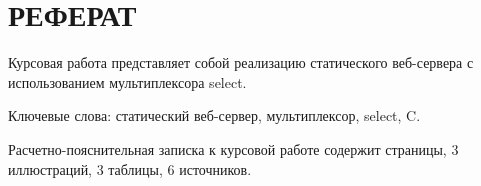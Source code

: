 \chapter*{РЕФЕРАТ}

\setcounter{page}{3}

Курсовая работа представляет собой реализацию статического веб-сервера с использованием мультиплексора select.

Ключевые слова: статический веб-сервер, мультиплексор, select, C.

Расчетно-пояснительная записка к курсовой работе содержит \pageref{LastPage} страницы, 3 иллюстраций, 3 таблицы, 6 источников.



